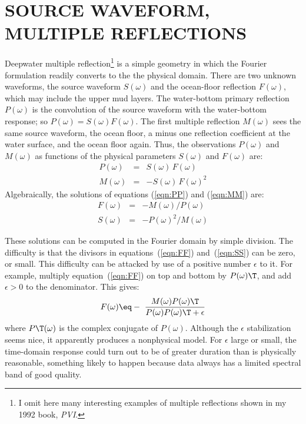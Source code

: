 \section{SOURCE WAVEFORM, MULTIPLE REFLECTIONS}
Deepwater multiple reflection\footnote{
                I omit here many interesting examples of multiple reflections
                shown in my 1992 book, {\em PVI}.
                }
is a simple geometry in which the Fourier formulation
readily converts to the the physical domain.
There are two unknown waveforms,
the source waveform $S(\omega )$
and the ocean-floor reflection $F(\omega )$, which may include the upper mud layers.
The water-bottom primary reflection $P(\omega )$
is the convolution of the source waveform
with the water-bottom response; so $P(\omega )=S(\omega )F(\omega )$.
The first multiple reflection $M(\omega )$ sees the same source waveform,
the ocean floor, a minus one reflection coefficient at the water surface,
and the ocean floor again.
Thus, the observations $P(\omega )$ and $M(\omega )$
as functions of the physical parameters
$S(\omega)$ and
$F(\omega)$
are:
\begin{eqnarray}
P(\omega )&=&S(\omega )\,F(\omega )      \label{eqn:PP} \\
M(\omega )&=&-S(\omega )\,F(\omega )^2   \label{eqn:MM}
\end{eqnarray}
Algebraically, the solutions of equations
(\ref{eqn:PP}) and
(\ref{eqn:MM}) are:
\begin{eqnarray}
F(\omega )&=& - M(\omega )/P(\omega )   \label{eqn:FF} \\
S(\omega )&=& - P(\omega )^2/M(\omega ) \label{eqn:SS}
\end{eqnarray}

\par
These solutions can be computed in the Fourier domain
by simple division.
The difficulty is that the divisors in
equations~(\ref{eqn:FF}) and~(\ref{eqn:SS})
can be zero, or small.
This difficulty can be attacked by use of a positive number $\epsilon$
to  it.
For example, multiply equation~(\ref{eqn:FF}) on top and bottom
by $P(\omega )\T$, and add $\epsilon >0$ to the denominator.
This gives:
\begin{equation}
F(\omega )\eq
- \ \frac{M(\omega ) P(\omega )\T }{ P(\omega )P(\omega )\T + \epsilon}
\label{eqn:epsilon}
\end{equation}
where $ P\T(\omega )$ is the complex conjugate of $P(\omega )$.
Although the $\epsilon$ stabilization seems nice,
it apparently produces a nonphysical model.
For $\epsilon$ large or small, the time-domain response
could turn out to be of greater duration than is physically reasonable,
something likely to happen
because data always has a limited spectral band of good quality.

